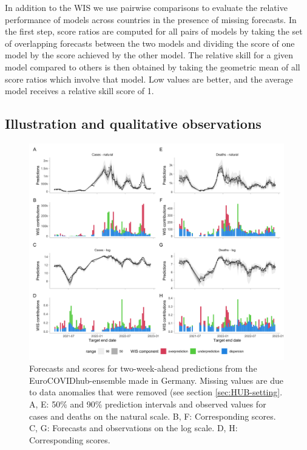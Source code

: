\documentclass{article}
\begin{document}
In addition to the WIS we use pairwise comparisons \citep{cramerEvaluationIndividualEnsemble2021} to evaluate the relative performance of models across countries in the presence of missing forecasts. In the first step, score ratios are computed for all pairs of models by taking the set of overlapping forecasts between the two models and dividing the score of one model by the score achieved by the other model. The relative skill for a given model compared to others is then obtained by taking the geometric mean of all score ratios which involve that model. Low values are better, and the average model receives a relative skill score of 1. 





\subsection{Illustration and qualitative observations}

\begin{figure}[h!]
    \centering
    \includegraphics[width=0.99\textwidth]{output/figures/HUB-model-comparison-ensemble.png}
    \caption{
    Forecasts and scores for two-week-ahead predictions from the EuroCOVIDhub-ensemble made in Germany. Missing values are due to data anomalies that were removed (see section \ref{sec:HUB-setting}. 
    A, E: 50\% and 90\% prediction intervals and observed values for cases and deaths on the natural scale. B, F: Corresponding scores. C, G: Forecasts and observations on the log scale. D, H: Corresponding scores. 
    }
    \label{fig:HUB-model-comparison-ensemble}
\end{figure}
\end{document}

